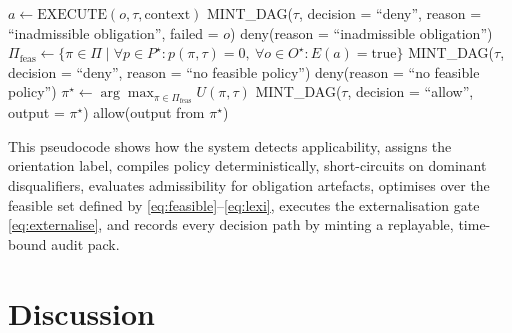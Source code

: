 \documentclass[oneside,10pt]{swissi}
\begin{document}
\pagebreak

\begin{algorithm}[H]
\caption{Execution flow for task $\tau$ (Part II, continued)}
\label{alg:task-execution-flow-part2}
\begin{algorithmic}[1]
\setcounter{ALG@line}{19}   %
        \State $a \gets \text{EXECUTE}(o, \tau, \text{context})$
            \State MINT\_DAG($\tau$, decision = ``deny'', reason = ``inadmissible obligation'', failed = $o$)
            \State \Return deny(reason = ``inadmissible obligation'')
        \EndIf
    \EndFor
    \State $\Pi_{\text{feas}} \gets \{\pi \in \Pi \mid \forall p \in P^\star: p(\pi, \tau) = 0,\ \forall o \in O^\star: E(a) = \text{true}\}$
        \State MINT\_DAG($\tau$, decision = ``deny'', reason = ``no feasible policy'')
        \State \Return deny(reason = ``no feasible policy'')
    \EndIf
    \State $\pi^\star \gets \arg\max_{\pi \in \Pi_{\text{feas}}} U(\pi, \tau)$
    \State MINT\_DAG($\tau$, decision = ``allow'', output = $\pi^\star$)
    \State \Return allow(output from $\pi^\star$)
\EndIf
\end{algorithmic}
\end{algorithm}


This pseudocode shows how the system detects applicability, assigns the orientation label, compiles policy deterministically, short-circuits on dominant disqualifiers, evaluates admissibility for obligation artefacts, optimises over the feasible set defined by \eqref{eq:feasible}–\eqref{eq:lexi}, executes the externalisation gate \eqref{eq:externalise}, and records every decision path by minting a replayable, time-bound audit pack.

\section{Discussion}
\end{document}
